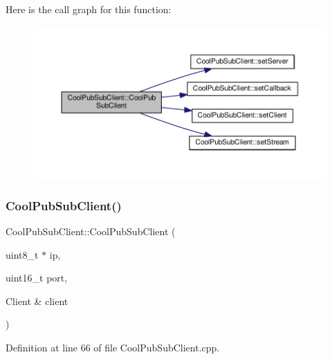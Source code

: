 Here is the call graph for this function\+:\nopagebreak
\begin{figure}[H]
\begin{center}
\leavevmode
\includegraphics[width=350pt]{class_cool_pub_sub_client_a0797679d710bf2b1aa802107bdb1a2fe_cgraph}
\end{center}
\end{figure}
\mbox{\label{class_cool_pub_sub_client_a15e4dd41ebda943c377539086f70469d}} 
\subsubsection{\texorpdfstring{Cool\+Pub\+Sub\+Client()}{CoolPubSubClient()}\hspace{0.1cm}{\footnotesize\ttfamily [7/14]}}
{\footnotesize\ttfamily Cool\+Pub\+Sub\+Client\+::\+Cool\+Pub\+Sub\+Client (\begin{DoxyParamCaption}\item[{uint8\+\_\+t $\ast$}]{ip,  }\item[{uint16\+\_\+t}]{port,  }\item[{Client \&}]{client }\end{DoxyParamCaption})}



Definition at line 66 of file Cool\+Pub\+Sub\+Client.\+cpp.

